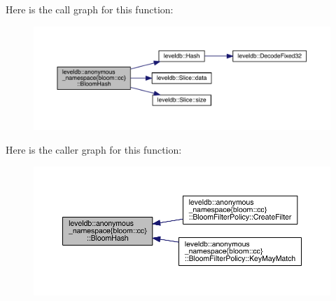 Here is the call graph for this function\+:
\nopagebreak
\begin{figure}[H]
\begin{center}
\leavevmode
\includegraphics[width=350pt]{namespaceleveldb_1_1anonymous__namespace_02bloom_8cc_03_ad617a30a8b4aaee1d274539390f79dc1_cgraph}
\end{center}
\end{figure}




Here is the caller graph for this function\+:
\nopagebreak
\begin{figure}[H]
\begin{center}
\leavevmode
\includegraphics[width=350pt]{namespaceleveldb_1_1anonymous__namespace_02bloom_8cc_03_ad617a30a8b4aaee1d274539390f79dc1_icgraph}
\end{center}
\end{figure}


